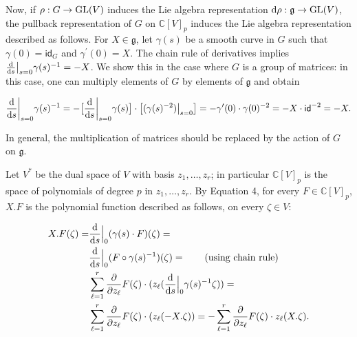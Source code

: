 Now, if $\rho:G\to\textnormal{GL}(V)$ induces the Lie algebra representation $\textnormal{d}\rho:\mathfrak{g}\to\textnormal{GL}(V)$, the pullback representation of $G$ on $\mathbb{C}[V]_{p}$ induces the Lie algebra representation described as follows. For $X\in\mathfrak{g}$, let $\gamma(s)$ be a smooth curve in $G$ such that $\gamma(0)=\mathsf{id}_{G}$ and $\gamma^{\prime}(0)=X$. The chain rule of derivatives implies $\frac{\textnormal{d}}{\textnormal{d}s}\big{|}_{s=0}\gamma(s)^{-1}=-X$. We show this in the case where $G$ is a group of matrices: in this case, one can multiply elements of $G$ by elements of $\mathfrak{g}$ and obtain



\[\begin{aligned}
\frac{\textnormal{d}}{\textnormal{d}s}\bigg{|}_{s=0}\gamma(s)^{-1}=-\bigl{[}\frac{\textnormal{d}}{\textnormal{d}s}\bigg{|}_{s=0}\gamma(s)\bigr{]}\cdot\bigl{[}(\gamma(s)^{-2})\big{|}_{s=0}\bigr{]}=-\gamma^{\prime}(0)\cdot\gamma(0)^{-2}=-X\cdot\mathsf{id}^{-2}=-X.
\end{aligned}\]


In general, the multiplication of matrices should be replaced by the action of $G$ on $\mathfrak{g}$.





Let $V^{*}$ be the dual space of $V$ with basis $z_{1},\ldots,z_{r}$; in particular $\mathbb{C}[V]_{p}$ is the space of polynomials of degree $p$ in $z_{1},\ldots,z_{r}$. By Equation 4, for every $F\in\mathbb{C}[V]_{p}$, $X.F$ is the polynomial function described as follows, on every $\zeta\in V$:



\[\begin{aligned}
\displaystyle X.F(\zeta)= & \displaystyle\frac{\textnormal{d}}{\textnormal{d}s}\Big{|}_{0}(\gamma(s)\cdot F)(\zeta)= \\
 & \displaystyle\frac{\textnormal{d}}{\textnormal{d}s}\Big{|}_{0}(F\circ\gamma(s)^{-1})(\zeta)=\qquad(\text{using chain rule}) \\
 & \displaystyle\sum_{\ell=1}^{r}\frac{\partial}{\partial z_{\ell}}F(\zeta)\cdot(z_{\ell}(\frac{\textnormal{d}}{\textnormal{d}s}\Big{|}_{0}\gamma(s)^{-1}\zeta))= \\
 & \displaystyle\sum_{\ell=1}^{r}\frac{\partial}{\partial z_{\ell}}F(\zeta)\cdot(z_{\ell}(-X.\zeta))=-\sum_{\ell=1}^{r}\frac{\partial}{\partial z_{\ell}}F(\zeta)\cdot z_{\ell}(X.\zeta).
\end{aligned}\]


